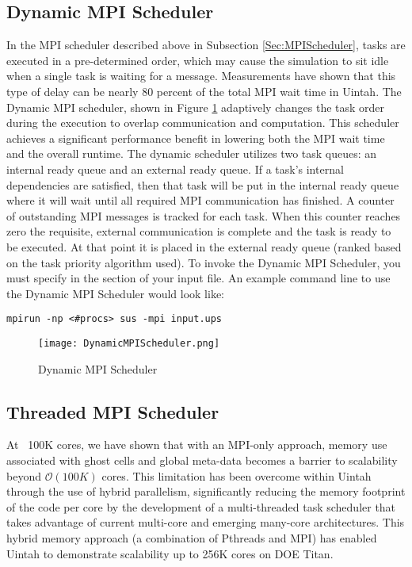 \subsection{Dynamic MPI Scheduler} \label{Sec:DynamicMPIScheduler} In the MPI
scheduler described above in Subsection \ref{Sec:MPIScheduler}, tasks are
executed in a pre-determined order, which may cause the simulation to sit idle
when a single task is waiting for a message. Measurements have shown that this
type of delay can be nearly 80 percent of the total MPI wait time in Uintah.
The Dynamic MPI scheduler, shown in Figure \ref{fig:DynamicMPIScheduler}
adaptively changes the task order during the execution to overlap communication
and computation. This scheduler achieves a significant performance benefit in
lowering both the MPI wait time and the overall runtime. The dynamic scheduler
utilizes two task queues: an internal ready queue and an external ready queue.
If a task’s internal dependencies are satisfied, then that task will be put in
the internal ready queue where it will wait until all required MPI
communication has finished. A counter of outstanding MPI messages is tracked
for each task. When this counter reaches zero the requisite, external
communication is complete and the task is ready to be executed. At that point
it is placed in the external ready queue (ranked based on the task priority
algorithm used). To invoke the Dynamic MPI Scheduler, you must specify
 in the  section of your input file. An example
command line to use the Dynamic MPI Scheduler would look like:

\begin{Verbatim}[fontsize=\footnotesize]
mpirun -np <#procs> sus -mpi input.ups
\end{Verbatim}

\begin{figure}[H]
  \centering
  \texttt{[image: DynamicMPIScheduler.png]}
  \caption{Dynamic MPI Scheduler}
  \label{fig:DynamicMPIScheduler}
\end{figure}


\subsection{Threaded MPI Scheduler} \label{Sec:ThreadedMPIScheduler}
At ~100K cores, we have shown that with an MPI-only approach, memory use
associated with ghost cells and global meta-data becomes a barrier to
scalability beyond $\mathcal{O}(100K)$ cores. This limitation has been overcome
within Uintah through the use of hybrid parallelism, significantly reducing the
memory footprint of the code per core by the development of a multi-threaded
task scheduler that takes advantage of current multi-core and emerging
many-core architectures. This hybrid memory approach (a combination of Pthreads
and MPI) has enabled Uintah to demonstrate scalability up to 256K cores on DOE
Titan.

